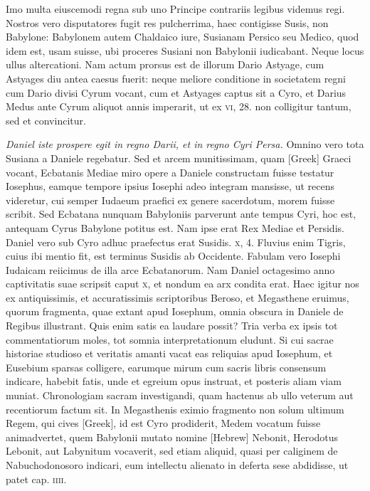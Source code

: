 \begin{parnumbers}
{}
\lnr{}Imo multa eiuscemodi regna sub uno Principe contrariis legibus videmus regi.
\lnr{}Nostros vero disputatores fugit res pulcherrima, haec contigisse
Susis, non Babylone: Babylonem autem Chaldaico iure, Susianam
Persico seu Medico, quod idem est, usam suisse, ubi proceres Susiani
non Babylonii iudicabant.
\lnr{}Neque locus ullus altercationi.
\lnr{}Nam actum prorsus est de illorum Dario Astyage, cum Astyages diu antea
caesus fuerit: neque meliore conditione in societatem regni cum
Dario divisi Cyrum vocant, cum et Astyages captus sit a Cyro, et
Darius Medus ante Cyrum aliquot annis imperarit, ut ex \textsc{vi}, 28.
non colligitur tantum, sed et convincitur.

\textit{Daniel iste prospere egit in regno Darii, et in regno Cyri Persa.}
\lnr{}Omnino vero tota Susiana a Daniele regebatur.
\lnr{}Sed et arcem munitissimam, quam \textgreek{[Greek]}
Graeci vocant, Ecbatanis Mediae miro opere a Daniele constructam
fuisse testatur Iosephus, eamque tempore ipsius Iosephi adeo
integram mansisse, ut recens videretur, cui semper Iudaeum praefici
ex genere sacerdotum, morem fuisse scribit.
\lnr{}Sed Ecbatana nunquam
Babyloniis parverunt ante tempus Cyri, hoc est, antequam
Cyrus Babylone potitus est.
\lnr{}Nam ipse erat Rex Mediae et Persidis.
\lnr{}Daniel vero sub Cyro adhuc praefectus erat Susidis. \textsc{x}, 4.
\lnr{}Fluvius
enim Tigris, cuius ibi mentio fit, est terminus Susidis ab Occidente.
\lnr{}Fabulam vero Iosephi Iudaicam reiicimus de illa arce Ecbatanorum.
\lnr{}Nam Daniel octagesimo anno captivitatis suae scripsit caput
\textsc{x}, et nondum ea arx condita erat.
\lnr{}Haec igitur nos ex antiquissimis,
et accuratissimis scriptoribus Beroso, et Megasthene eruimus, quorum
fragmenta, quae extant apud Iosephum, omnia obscura in Daniele
de Regibus illustrant.
\lnr{}Quis enim satis ea laudare possit?
\lnr{}Tria verba ex ipsis tot commentatiorum moles, tot somnia interpretationum
eludunt.
\lnr{}Si cui sacrae historiae studioso et veritatis amanti
vacat eas reliquias apud Iosephum, et Eusebium sparsas colligere,
earumque mirum cum sacris libris consensum indicare, habebit
fatis, unde et egreium opus instruat, et posteris aliam viam
muniat.
\lnr{}Chronologiam sacram investigandi, quam hactenus
ab ullo veterum aut recentiorum factum sit.
\lnr{}In Megasthenis eximio fragmento non solum ultimum Regem, qui cives
 \textgreek{[Greek]}, id
est Cyro prodiderit, Medem vocatum fuisse animadvertet, quem
Babylonii mutato nomine \texthebrew{[Hebrew]} Nebonit, Herodotus Lebonit,
aut Labynitum vocaverit, sed etiam aliquid, quasi per caliginem
de Nabuchodonosoro indicari, eum intellectu alienato in deferta
sese abdidisse, ut patet cap. \textsc{iiii}.


\end{parnumbers}
